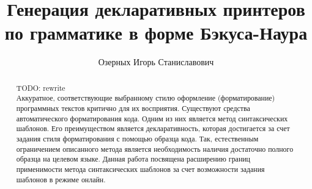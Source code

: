 \title{Генерация декларативных принтеров по грамматике в форме Бэкуса-Наура}


\author{Озерных Игорь Станиславович}



\maketitle             

\begin{abstract}
TODO: rewrite \\
Аккуратное, соответствующие выбранному стилю оформление (форматирование)
программных текстов критично для их восприятия.
Существуют средства автоматического форматирования кода. Одним
из них является метод синтаксических шаблонов. Его преимуществом является декларативность, которая
достигается за счет задания стиля форматирования с помощью образца кода. Так, естественным ограничением
описанного метода является необходимость наличия достаточно полного образца на целевом языке.
Данная работа посвящена расширению границ применимости метода синтаксических шаблонов
за счет возможности задания шаблонов в режиме онлайн.
\end{abstract}












